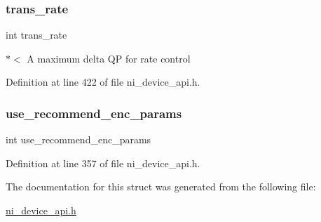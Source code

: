 \subsubsection{\texorpdfstring{trans\_rate}{trans\_rate}}
{\footnotesize\ttfamily int trans\+\_\+rate}

$\ast$$<$ A maximum delta QP for rate control 

Definition at line 422 of file ni\+\_\+device\+\_\+api.\+h.

\mbox{\label{struct__ni__h265__encoder__params_adc903dccf6e4a3f07bf75e217746a385}} 
\subsubsection{\texorpdfstring{use\_recommend\_enc\_params}{use\_recommend\_enc\_params}}
{\footnotesize\ttfamily int use\+\_\+recommend\+\_\+enc\+\_\+params}



Definition at line 357 of file ni\+\_\+device\+\_\+api.\+h.



The documentation for this struct was generated from the following file\+:\begin{DoxyCompactItemize}
\item 
\mbox{\hyperlink{ni__device__api_8h}{ni\+\_\+device\+\_\+api.\+h}}\end{DoxyCompactItemize}
